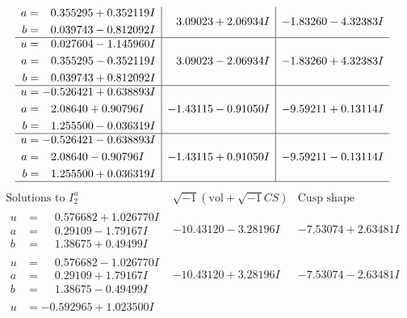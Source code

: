 \documentclass[1p]{elsarticle_modified}
\theoremstyle{definition}
\newcommand{\I}{\sqrt{-1}}
\begin{document}
$$\begin{array}{c|c|c}
\begin{aligned}
a &= \phantom{-}0.355295 + 0.352119 I \\
b &= \phantom{-}0.039743 - 0.812092 I\end{aligned}
 & \phantom{-}3.09023 + 2.06934 I & -1.83260 - 4.32383 I \\ \hline\begin{aligned}
u &= \phantom{-}0.027604 - 1.145960 I \\
a &= \phantom{-}0.355295 - 0.352119 I \\
b &= \phantom{-}0.039743 + 0.812092 I\end{aligned}
 & \phantom{-}3.09023 - 2.06934 I & -1.83260 + 4.32383 I \\ \hline\begin{aligned}
u &= -0.526421 + 0.638893 I \\
a &= \phantom{-}2.08640 + 0.90796 I \\
b &= \phantom{-}1.255500 - 0.036319 I\end{aligned}
 & -1.43115 - 0.91050 I & -9.59211 + 0.13114 I \\ \hline\begin{aligned}
u &= -0.526421 - 0.638893 I \\
a &= \phantom{-}2.08640 - 0.90796 I \\
b &= \phantom{-}1.255500 + 0.036319 I\end{aligned}
 & -1.43115 + 0.91050 I & -9.59211 - 0.13114 I\\
 \hline 
 \end{array}$$\newpage$$\begin{array}{c|c|c}  
\text{Solutions to }I^u_{2}& \I (\text{vol} + \sqrt{-1}CS) & \text{Cusp shape}\\
 \hline 
\begin{aligned}
u &= \phantom{-}0.576682 + 1.026770 I \\
a &= \phantom{-}0.29109 - 1.79167 I \\
b &= \phantom{-}1.38675 + 0.49499 I\end{aligned}
 & -10.43120 - 3.28196 I & -7.53074 + 2.63481 I \\ \hline\begin{aligned}
u &= \phantom{-}0.576682 - 1.026770 I \\
a &= \phantom{-}0.29109 + 1.79167 I \\
b &= \phantom{-}1.38675 - 0.49499 I\end{aligned}
 & -10.43120 + 3.28196 I & -7.53074 - 2.63481 I \\ \hline\begin{aligned}
u &= -0.592965 + 1.023500 I \\

\end{aligned}
\end{array}$$
\end{document}
